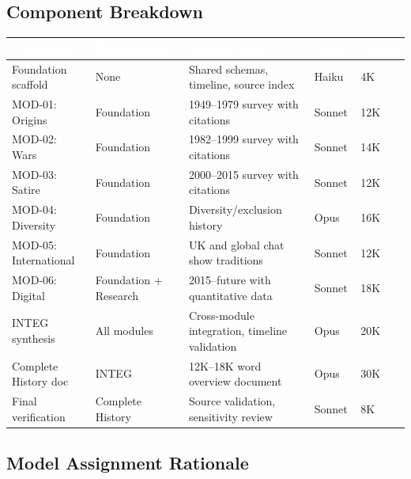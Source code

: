 \documentclass[11pt,letterpaper]{article}
\newcommand{\tableheader}[1]{\textbf{\sffamily\textcolor{white}{#1}}}
\begin{document}
\subsection{Component Breakdown}

\begin{center}
\begin{tabularx}{\textwidth}{L{3cm}L{2cm}XC{1.8cm}C{1.5cm}}
\toprule
{}
\tableheader{Component} & \tableheader{Dependencies} & \tableheader{Responsibility} & \tableheader{Model} & \tableheader{Tokens} \\
\midrule
Foundation scaffold & None & Shared schemas, timeline, source index & Haiku & 4K \\
MOD-01: Origins & Foundation & 1949--1979 survey with citations & Sonnet & 12K \\
MOD-02: Wars & Foundation & 1982--1999 survey with citations & Sonnet & 14K \\
MOD-03: Satire & Foundation & 2000--2015 survey with citations & Sonnet & 12K \\
MOD-04: Diversity & Foundation & Diversity/exclusion history & Opus & 16K \\
MOD-05: International & Foundation & UK and global chat show traditions & Sonnet & 12K \\
MOD-06: Digital & Foundation + Research & 2015--future with quantitative data & Sonnet & 18K \\
INTEG synthesis & All modules & Cross-module integration, timeline validation & Opus & 20K \\
Complete History doc & INTEG & 12K--18K word overview document & Opus & 30K \\
Final verification & Complete History & Source validation, sensitivity review & Sonnet & 8K \\
\bottomrule
\end{tabularx}
\end{center}

\subsection{Model Assignment Rationale}
\end{document}
